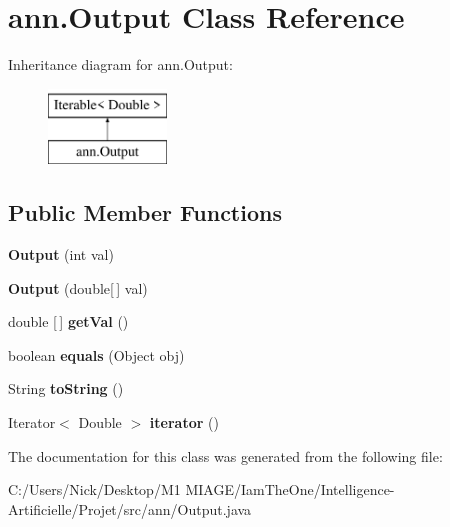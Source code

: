 \hypertarget{classann_1_1_output}{}\section{ann.\+Output Class Reference}
\label{classann_1_1_output}
Inheritance diagram for ann.\+Output\+:\begin{figure}[H]
\begin{center}
\leavevmode
\includegraphics[height=2.000000cm]{classann_1_1_output}
\end{center}
\end{figure}
\subsection*{Public Member Functions}
\begin{DoxyCompactItemize}
\item 
\mbox{\label{classann_1_1_output_a7ab3d7c14034fdbe2d6482935f44c9a0}} 
{\bfseries Output} (int val)
\item 
\mbox{\label{classann_1_1_output_a82f2133f54dcc48c400f894a62eec8f0}} 
{\bfseries Output} (double\mbox{[}$\,$\mbox{]} val)
\item 
\mbox{\label{classann_1_1_output_a29ceaac61553a61df12b616d3d62ee84}} 
double \mbox{[}$\,$\mbox{]} {\bfseries get\+Val} ()
\item 
\mbox{\label{classann_1_1_output_aa144e935bfe1b126ba527151b1653b69}} 
boolean {\bfseries equals} (Object obj)
\item 
\mbox{\label{classann_1_1_output_a7617bd1ab1914c05d797e8bf93b9dcd7}} 
String {\bfseries to\+String} ()
\item 
\mbox{\label{classann_1_1_output_abf286f373059401bfa29bafbe134ebbc}} 
Iterator$<$ Double $>$ {\bfseries iterator} ()
\end{DoxyCompactItemize}


The documentation for this class was generated from the following file\+:\begin{DoxyCompactItemize}
\item 
C\+:/\+Users/\+Nick/\+Desktop/\+M1 M\+I\+A\+G\+E/\+Iam\+The\+One/\+Intelligence-\/\+Artificielle/\+Projet/src/ann/Output.\+java\end{DoxyCompactItemize}
